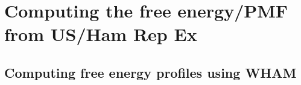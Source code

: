 \documentclass[9pt]{livecoms}
\begin{document}
\section{Computing the free energy/PMF from US/Ham Rep Ex}



\subsection{Computing free energy profiles using WHAM}
 

%
\end{document}
